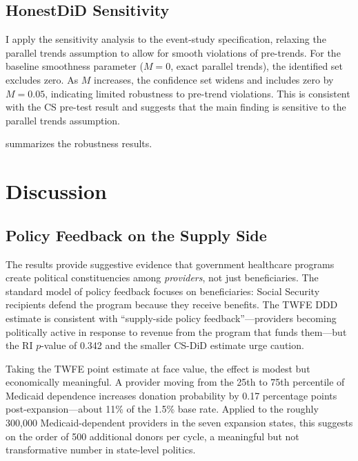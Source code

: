 \documentclass[12pt]{article}
\begin{document}
\subsection{HonestDiD Sensitivity}

I apply the \citet{rambachan2023more} sensitivity analysis to the event-study specification, relaxing the parallel trends assumption to allow for smooth violations of pre-trends. For the baseline smoothness parameter ($M = 0$, exact parallel trends), the identified set excludes zero. As $M$ increases, the confidence set widens and includes zero by $M = 0.05$, indicating limited robustness to pre-trend violations. This is consistent with the CS pre-test result and suggests that the main finding is sensitive to the parallel trends assumption.

 summarizes the robustness results.




\section{Discussion}\label{sec:discussion}

\subsection{Policy Feedback on the Supply Side}

The results provide suggestive evidence that government healthcare programs create political constituencies among \textit{providers}, not just beneficiaries. The standard model of policy feedback \citep{pierson1993when} focuses on beneficiaries: Social Security recipients defend the program because they receive benefits. The TWFE DDD estimate is consistent with ``supply-side policy feedback''---providers becoming politically active in response to revenue from the program that funds them---but the RI $p$-value of 0.342 and the smaller CS-DiD estimate urge caution.

Taking the TWFE point estimate at face value, the effect is modest but economically meaningful. A provider moving from the 25th to 75th percentile of Medicaid dependence increases donation probability by 0.17 percentage points post-expansion---about 11\% of the 1.5\% base rate. Applied to the roughly 300,000 Medicaid-dependent providers in the seven expansion states, this suggests on the order of 500 additional donors per cycle, a meaningful but not transformative number in state-level politics.
\end{document}
